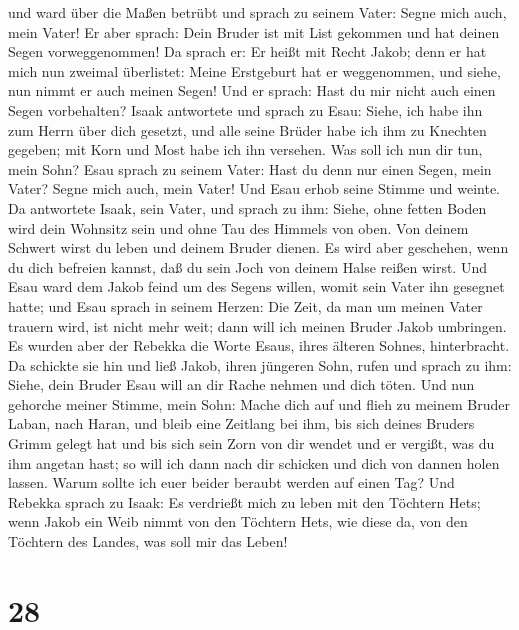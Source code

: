 und ward über die Maßen betrübt und sprach zu seinem Vater: Segne mich
auch, mein Vater!  Er aber sprach: Dein Bruder ist mit
List gekommen und hat deinen Segen vorweggenommen!  Da
sprach er: Er heißt mit Recht Jakob; denn er hat mich nun zweimal
überlistet: Meine Erstgeburt hat er weggenommen, und siehe, nun nimmt er
auch meinen Segen! Und er sprach: Hast du mir nicht auch einen Segen
vorbehalten?  Isaak antwortete und sprach zu Esau: Siehe,
ich habe ihn zum Herrn über dich gesetzt, und alle seine Brüder habe ich
ihm zu Knechten gegeben; mit Korn und Most habe ich ihn versehen. Was
soll ich nun dir tun, mein Sohn?  Esau sprach zu seinem
Vater: Hast du denn nur einen Segen, mein Vater? Segne mich auch, mein
Vater! Und Esau erhob seine Stimme und weinte.  Da
antwortete Isaak, sein Vater, und sprach zu ihm: Siehe, ohne fetten
Boden wird dein Wohnsitz sein und ohne Tau des Himmels von oben.
 Von deinem Schwert wirst du leben und deinem Bruder
dienen. Es wird aber geschehen, wenn du dich befreien kannst, daß du
sein Joch von deinem Halse reißen wirst.  Und Esau ward
dem Jakob feind um des Segens willen, womit sein Vater ihn gesegnet
hatte; und Esau sprach in seinem Herzen: Die Zeit, da man um meinen
Vater trauern wird, ist nicht mehr weit; dann will ich meinen Bruder
Jakob umbringen.  Es wurden aber der Rebekka die Worte
Esaus, ihres älteren Sohnes, hinterbracht. Da schickte sie hin und ließ
Jakob, ihren jüngeren Sohn, rufen und sprach zu ihm: Siehe, dein Bruder
Esau will an dir Rache nehmen und dich töten.  Und nun
gehorche meiner Stimme, mein Sohn: Mache dich auf und flieh zu meinem
Bruder Laban, nach Haran,  und bleib eine Zeitlang bei
ihm, bis sich deines Bruders Grimm gelegt hat  und bis
sich sein Zorn von dir wendet und er vergißt, was du ihm angetan hast;
so will ich dann nach dir schicken und dich von dannen holen lassen.
Warum sollte ich euer beider beraubt werden auf einen Tag?
 Und Rebekka sprach zu Isaak: Es verdrießt mich zu leben
mit den Töchtern Hets; wenn Jakob ein Weib nimmt von den Töchtern Hets,
wie diese da, von den Töchtern des Landes, was soll mir das Leben!

\hypertarget{section-27}{%
\section{28}\label{section-27}}

